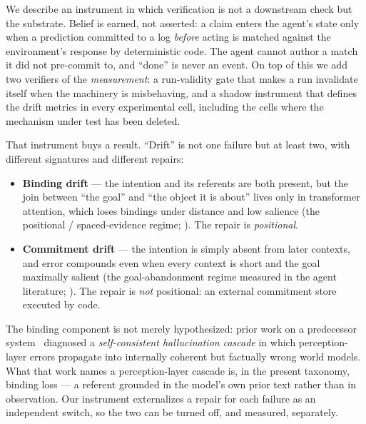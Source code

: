 \documentclass{article}
\newif\ifanon
\begin{document}
We describe an instrument in which verification is not a downstream check but the
substrate. Belief is earned, not asserted: a claim enters the agent's state only
when a prediction committed to a log \emph{before} acting is matched against the
environment's response by deterministic code. The agent cannot author a match it
did not pre-commit to, and ``done'' is never an event. On top of this we add two
verifiers of the \emph{measurement}: a run-validity gate that makes a run
invalidate itself when the machinery is misbehaving, and a shadow instrument that
defines the drift metrics in every experimental cell, including the cells where
the mechanism under test has been deleted.

That instrument buys a result. ``Drift'' is not one failure but at least two,
with different signatures and different repairs:
\begin{itemize}
\item \textbf{Binding drift} --- the intention and its referents are both present,
but the join between ``the goal'' and ``the object it is about'' lives only in
transformer attention, which loses bindings under distance and low salience (the
positional / spaced-evidence regime; \citealp{longpibench2024,liu2023lost}). The
repair is \emph{positional}.
\item \textbf{Commitment drift} --- the intention is simply absent from later
contexts, and error compounds even when every context is short and the goal
maximally salient (the goal-abandonment regime measured in the agent literature;
\citealp{arike2025goaldrift,menon2026inherited}). The repair is \emph{not}
positional: an external commitment store executed by code.
\end{itemize}
The binding component is not merely hypothesized: prior work on a predecessor
system~\ifanon\citep{sensi_anon}\else\citep{arjmandi2026sensi}\fi{} diagnosed a
\emph{self-consistent hallucination cascade} in which perception-layer errors
propagate into internally coherent but factually wrong world models. What that work names a perception-layer cascade is,
in the present taxonomy, binding loss --- a referent grounded in the model's own
prior text rather than in observation. Our instrument externalizes a repair for
each failure as an independent switch, so the two can be turned off, and measured,
separately.
\end{document}
